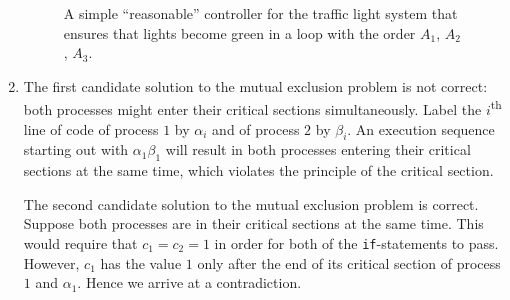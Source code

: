 \documentclass[11pt,letterpaper]{article}
\newcommand{\ai}{\alpha_1}
\newcommand{\bi}{\beta_1}
\begin{document}
\begin{enumerate}
        \begin{figure}[ht]
            \centering
            \caption{
                A simple ``reasonable'' controller for the traffic light system
                that ensures that lights become green in a loop with the order
                $A_1$, $A_2$, $A_3$.
            }
            \label{fig:controller}
        \end{figure}

    \item
        The first candidate solution to the mutual exclusion problem is not
        correct: both processes might enter their critical sections
        simultaneously. Label the $i$\textsuperscript{th} line of code of
        process $1$ by $\alpha_i$ and of process $2$ by $\beta_i$.
        An execution sequence starting out with $\ai \bi$ will result in both
        processes entering their critical sections at the same time, which
        violates the principle of the critical section.

        The second candidate solution to the mutual exclusion problem is
        correct. Suppose both processes are in their critical sections at the
        same time. This would require that $c_1 = c_2 = 1$ in order for both of
        the \texttt{if}-statements to pass. However, $c_1$ has the value $1$
        only after the end of its critical section of process $1$ and
        $\alpha_1$. Hence we arrive at a contradiction.


\end{enumerate}
\end{document}
